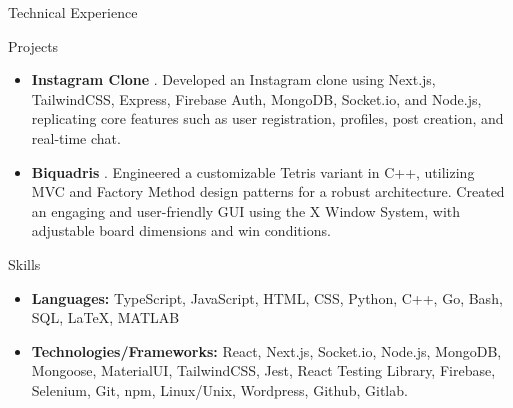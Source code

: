 \documentclass[]{mcdowellcv}
\begin{document}
	\begin{cvsection}{Technical Experience}
		\begin{cvsubsection}{Projects}{}{}
			\begin{itemize}
				\item \textbf{Instagram Clone} \href{https://github.com/pl3lee/instagram-clone}{\faGithub}. Developed an Instagram clone using Next.js, TailwindCSS, Express, Firebase Auth, MongoDB, Socket.io, and Node.js, replicating core features such as user registration, profiles, post creation, and real-time chat.
				\item \textbf{Biquadris} \href{https://github.com/pl3lee/Biquadris}{\faGithub}. Engineered a customizable Tetris variant in C++, utilizing MVC and Factory Method design patterns for a robust architecture. Created an engaging and user-friendly GUI using the X Window System, with adjustable board dimensions and win conditions.
			\end{itemize}
		\end{cvsubsection}
	\end{cvsection}
	
	
	\begin{cvsection}{Skills}
		\begin{cvsubsection}{}{}{}	
			\begin{itemize}
				\item \textbf{Languages:} TypeScript, JavaScript, HTML, CSS, Python, C++, Go, Bash, SQL, LaTeX, MATLAB
				\item \textbf{Technologies/Frameworks:} React, Next.js, Socket.io, Node.js, MongoDB, Mongoose, MaterialUI, TailwindCSS, Jest, React Testing Library, Firebase, Selenium, Git, npm, Linux/Unix, Wordpress, Github, Gitlab.
			\end{itemize}
		\end{cvsubsection}
	\end{cvsection}
	
\end{document}
